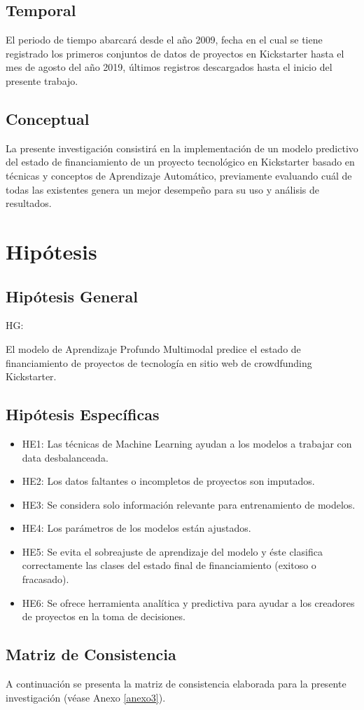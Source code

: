 \subsection{Temporal}
El periodo de tiempo abarcará desde el año 2009, fecha en el cual se tiene registrado los primeros conjuntos de datos de proyectos en Kickstarter hasta el mes de agosto del año 2019, últimos registros descargados hasta el inicio del presente trabajo.

\subsection{Conceptual}
La presente investigación consistirá en la implementación de un modelo predictivo del estado de financiamiento de un proyecto tecnológico en Kickstarter basado en técnicas y conceptos de Aprendizaje Automático, previamente evaluando cuál de todas las existentes genera un mejor desempeño para su uso y análisis de resultados.

\section{Hipótesis}

\subsection{Hipótesis General}
HG: \newcommand{\HipotesisGeneral}{
El modelo de Aprendizaje Profundo Multimodal predice el estado de financiamiento de proyectos de tecnología en sitio web de crowdfunding Kickstarter.
}
\HipotesisGeneral
\subsection{Hipótesis Específicas}
\newcommand{\Hone}{
Las técnicas de Machine Learning ayudan a los modelos a trabajar con data desbalanceada.
}
\newcommand{\Htwo}{
Los datos faltantes o incompletos de proyectos son imputados.
}
\newcommand{\Hthree}{
Se considera solo información relevante para entrenamiento de modelos.
}
\newcommand{\Hfour}{
Los parámetros de los modelos están ajustados.
}
\newcommand{\Hfive}{
Se evita el sobreajuste de aprendizaje del modelo y éste clasifica correctamente las clases del estado final de financiamiento (exitoso o fracasado).
}
\newcommand{\Hsix}{
Se ofrece herramienta analítica y predictiva para ayudar a los creadores de proyectos en la toma de decisiones.
}
\begin{itemize}
	\item HE1: \Hone
	\item HE2: \Htwo
	\item HE3: \Hthree
	\item HE4: \Hfour
	\item HE5: \Hfive
	\item HE6: \Hsix
\end{itemize}

\subsection{Matriz de Consistencia}
A continuación se presenta la matriz de consistencia elaborada para la presente investigación (véase Anexo \ref{anexo3}).

